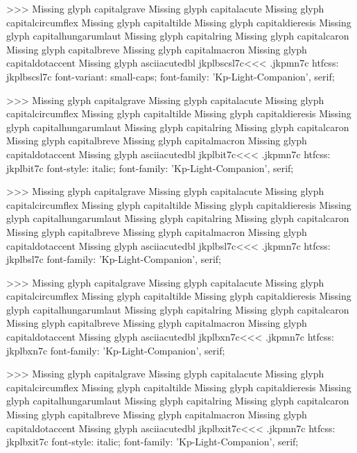 >>>
Missing glyph	capitalgrave
Missing glyph	capitalacute
Missing glyph	capitalcircumflex
Missing glyph	capitaltilde
Missing glyph	capitaldieresis
Missing glyph	capitalhungarumlaut
Missing glyph	capitalring
Missing glyph	capitalcaron
Missing glyph	capitalbreve
Missing glyph	capitalmacron
Missing glyph	capitaldotaccent
Missing glyph	asciiacutedbl
\<jkplbscsl7c\><<<
.jkpmn7c
htfcss:  jkplbscsl7c  font-variant: small-caps; font-family: 'Kp-Light-Companion', serif;

>>>
Missing glyph	capitalgrave
Missing glyph	capitalacute
Missing glyph	capitalcircumflex
Missing glyph	capitaltilde
Missing glyph	capitaldieresis
Missing glyph	capitalhungarumlaut
Missing glyph	capitalring
Missing glyph	capitalcaron
Missing glyph	capitalbreve
Missing glyph	capitalmacron
Missing glyph	capitaldotaccent
Missing glyph	asciiacutedbl
\<jkplbit7c\><<<
.jkpmn7c
htfcss:  jkplbit7c  font-style: italic; font-family: 'Kp-Light-Companion', serif;

>>>
Missing glyph	capitalgrave
Missing glyph	capitalacute
Missing glyph	capitalcircumflex
Missing glyph	capitaltilde
Missing glyph	capitaldieresis
Missing glyph	capitalhungarumlaut
Missing glyph	capitalring
Missing glyph	capitalcaron
Missing glyph	capitalbreve
Missing glyph	capitalmacron
Missing glyph	capitaldotaccent
Missing glyph	asciiacutedbl
\<jkplbsl7c\><<<
.jkpmn7c
htfcss:  jkplbsl7c  font-family: 'Kp-Light-Companion', serif;

>>>
Missing glyph	capitalgrave
Missing glyph	capitalacute
Missing glyph	capitalcircumflex
Missing glyph	capitaltilde
Missing glyph	capitaldieresis
Missing glyph	capitalhungarumlaut
Missing glyph	capitalring
Missing glyph	capitalcaron
Missing glyph	capitalbreve
Missing glyph	capitalmacron
Missing glyph	capitaldotaccent
Missing glyph	asciiacutedbl
\<jkplbxn7c\><<<
.jkpmn7c
htfcss:  jkplbxn7c  font-family: 'Kp-Light-Companion', serif;

>>>
Missing glyph	capitalgrave
Missing glyph	capitalacute
Missing glyph	capitalcircumflex
Missing glyph	capitaltilde
Missing glyph	capitaldieresis
Missing glyph	capitalhungarumlaut
Missing glyph	capitalring
Missing glyph	capitalcaron
Missing glyph	capitalbreve
Missing glyph	capitalmacron
Missing glyph	capitaldotaccent
Missing glyph	asciiacutedbl
\<jkplbxit7c\><<<
.jkpmn7c
htfcss:  jkplbxit7c  font-style: italic; font-family: 'Kp-Light-Companion', serif;

